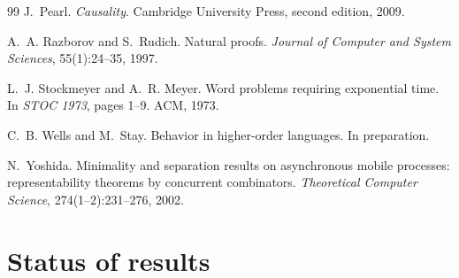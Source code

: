 \documentclass[11pt]{article}
\theoremstyle{definition}
\theoremstyle{plain}
\theoremstyle{remark}
\begin{document}
\begin{thebibliography}{99}
J.~Pearl.
\newblock \emph{Causality}.
\newblock Cambridge University Press, second edition, 2009.

A.~A. Razborov and S.~Rudich.
\newblock Natural proofs.
\newblock \emph{Journal of Computer and System Sciences}, 55(1):24--35,
1997.

L.~J. Stockmeyer and A.~R. Meyer.
\newblock Word problems requiring exponential time.
\newblock In \emph{STOC 1973}, pages 1--9. ACM, 1973.

C.~B. Wells and M.~Stay.
\newblock Behavior in higher-order languages.
\newblock In preparation.

N.~Yoshida.
\newblock Minimality and separation results on asynchronous mobile
processes: representability theorems by concurrent combinators.
\newblock \emph{Theoretical Computer Science}, 274(1--2):231--276, 2002.

\end{thebibliography}

\appendix

\section{Status of results}\label{app:status}
\end{document}
